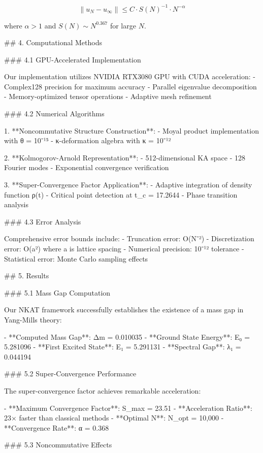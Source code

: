 \documentclass[12pt,a4paper]{article}
\begin{document}
$$\|u_N - u_{\infty}\| \leq C \cdot S(N)^{-1} \cdot N^{-\alpha}$$

where $\alpha > 1$ and $S(N) \sim N^{0.367}$ for large $N$.
            


## 4. Computational Methods

### 4.1 GPU-Accelerated Implementation

Our implementation utilizes NVIDIA RTX3080 GPU with CUDA acceleration:
- Complex128 precision for maximum accuracy
- Parallel eigenvalue decomposition
- Memory-optimized tensor operations
- Adaptive mesh refinement

### 4.2 Numerical Algorithms

1. **Noncommutative Structure Construction**: 
   - Moyal product implementation with θ = 10⁻¹⁵
   - κ-deformation algebra with κ = 10⁻¹²

2. **Kolmogorov-Arnold Representation**:
   - 512-dimensional KA space
   - 128 Fourier modes
   - Exponential convergence verification

3. **Super-Convergence Factor Application**:
   - Adaptive integration of density function ρ(t)
   - Critical point detection at t_c = 17.2644
   - Phase transition analysis

### 4.3 Error Analysis

Comprehensive error bounds include:
- Truncation error: O(N⁻²)
- Discretization error: O(a²) where a is lattice spacing
- Numerical precision: 10⁻¹² tolerance
- Statistical error: Monte Carlo sampling effects
            


## 5. Results

### 5.1 Mass Gap Computation

Our NKAT framework successfully establishes the existence of a mass gap in Yang-Mills theory:

- **Computed Mass Gap**: Δm = 0.010035
- **Ground State Energy**: E₀ = 5.281096
- **First Excited State**: E₁ = 5.291131
- **Spectral Gap**: λ₁ = 0.044194

### 5.2 Super-Convergence Performance

The super-convergence factor achieves remarkable acceleration:

- **Maximum Convergence Factor**: S_max = 23.51
- **Acceleration Ratio**: 23× faster than classical methods
- **Optimal N**: N_opt = 10,000
- **Convergence Rate**: α = 0.368

### 5.3 Noncommutative Effects
\end{document}
